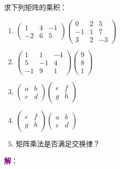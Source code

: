 \begin{example}
	求下列矩阵的乘积：
	\begin{enumerate}
		\item $\begin{pmatrix}  
			1 & 4 & -1 \\  
			-2 & 6 & 5  
		  \end{pmatrix} \begin{pmatrix}  
			0 & 2 & 5 \\  
			-1 & 1 & 7 \\
			3 & 2 & -3
		  \end{pmatrix}$
		\item $\begin{pmatrix}  
			1 & 1 & -4 \\  
			5 & -1 & 4 \\
			-1 & 9 & 1
		  \end{pmatrix}\begin{pmatrix}  
			9 \\
			8 \\
			1
		  \end{pmatrix}$
		\item $\begin{pmatrix}  
			a & b \\  
			c & d  
		  \end{pmatrix} \begin{pmatrix}  
			e & f \\  
			g & h  
		  \end{pmatrix} $
		\item $\begin{pmatrix}  
			e & f \\  
			g & h  
		  \end{pmatrix} \begin{pmatrix}  
			a & b \\  
			c & d  
		  \end{pmatrix} $
		\item 矩阵乘法是否满足交换律？
	\end{enumerate}
	\tcblower
	\textcolor{purple}{\textbf{解}}：
\end{example}
